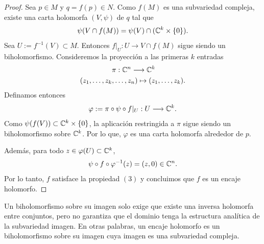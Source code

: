\begin{proof}
  			Sea $p\in M$ y $q=f(p)\in N$. Como $f(M)$ es una subvariedad compleja, existe una carta holomorfa $(V,\psi)$ de $q$ tal que
  			\begin{equation*}
  				\psi(V\cap f(M))=\psi(V)\cap (\mathbb{C}^k\times \{0\}).
  			\end{equation*} 
  			Sea $U:=f^{-1}(V)\subset M$. Entonces $f|_U:U\to V\cap f(M)$ sigue siendo un biholomorfismo. Consideremos la proyección a las primeras $k$ entradas
  			\begin{align*}
  				&\pi:\mathbb{C}^n\longrightarrow \mathbb{C}^k\\
  				(z_1,\dots,z_k&,\dots,z_n)\mapsto (z_1,\dots, z_k).
  			\end{align*} 
  			Definamos entonces 
  			\begin{equation*}
  				\varphi:=\pi\circ \psi\circ f|_U:U\longrightarrow\mathbb{C}^k.
  			\end{equation*}
    		Como $\psi(f(V))\subset \mathbb{C}^k\times \{0\}$, la aplicación restringida a $\pi$ sigue siendo un biholomorfismo sobre $\mathbb{C}^k$. Por lo que, $\varphi$ es una carta holomorfa alrededor de $p$.
    		
    		Además, para todo $z\in\varphi(U)\subset\mathbb{C}^k$, 
    		\begin{equation*}
    			\psi\circ f\circ \varphi^{-1}(z)=(z,0)\in\mathbb{C}^n.
    		\end{equation*}
    		Por lo tanto, $f$ satisface la propiedad $(3)$ y concluimos que $f$ es un encaje holomorfo. 
    \end{proof}
    
    Un biholomorfismo sobre su imagen solo exige que existe una inversa holomorfa entre conjuntos, pero no garantiza que el dominio tenga la estructura analítica de la subvariedad imagen. En otras palabras, un encaje holomorfo es un biholomorfismo sobre su imagen cuya imagen es una subvariedad compleja. 
    
%      	
   	
